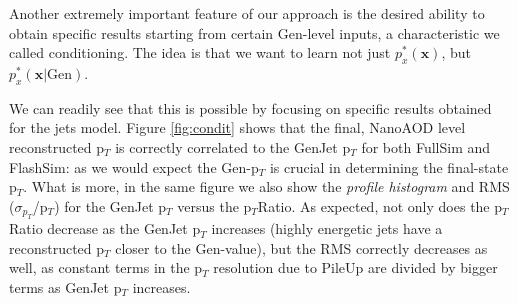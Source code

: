 Another extremely important feature of our approach is the desired ability to obtain specific results starting from certain Gen-level inputs, a characteristic we called conditioning. The idea is that we want to learn not just $p^*_x(\mathbf{x})$, but $p^*_x(\mathbf{x}|\text{Gen})$.

We can readily see that this is possible by focusing on specific results obtained for the jets model. Figure \ref{fig:condit} shows that the final, NanoAOD level reconstructed p$_T$ is correctly correlated to the GenJet p$_T$ for both FullSim and FlashSim: as we would expect the Gen-p$_T$ is crucial in determining the final-state p$_T$. What is more, in the same figure we also show the \emph{profile histogram} and RMS ($\sigma_{p_T}$/p$_T$) for the GenJet p$_T$ versus the p$_T$Ratio. As expected, not only does the p$_T$Ratio decrease as the GenJet p$_T$ increases (highly energetic jets have a reconstructed p$_T$ closer to the Gen-value), but the RMS correctly decreases as well, as constant terms in the p$_T$ resolution due to PileUp are divided by bigger terms as GenJet p$_T$ increases.


